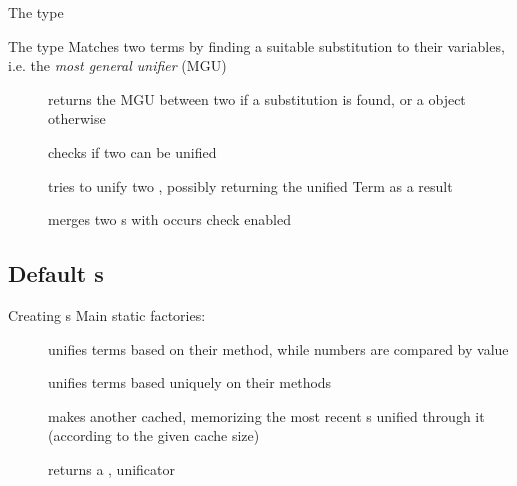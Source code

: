 \documentclass[handout]{beamer}
\begin{document}
\begin{frame}[allowframebreaks]{The  type}
    \begin{block}{The  type}\centering
        Matches two terms by finding a suitable substitution to their variables, i.e. the \emph{most general unifier} (MGU)
    \end{block}
    \begin{description}
        \item[] returns the MGU between two  if a substitution is found, or a  object otherwise
        \item[] checks if two  can be unified
        \item[] tries to unify two , possibly returning the unified Term as a result
        \item[] merges two s with occurs check enabled
    \end{description}
\end{frame}

\subsection{Default s}

\begin{frame}[allowframebreaks]{Creating s}
    Main  static factories:
    \begin{description}
        \item[] unifies terms based on their  method, while numbers are compared by value
        \item[] unifies terms based uniquely on their  methods
        \item[] makes another  cached, memorizing the most recent s unified through it (according to the given cache size)
        \item[] returns a ,  unificator
    \end{description}
\end{frame}
\end{document}
